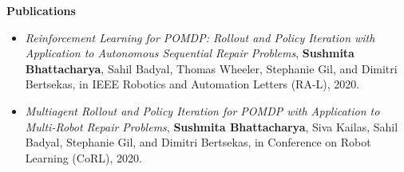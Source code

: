 \documentclass[a4paper,11pt]{article}
\newcommand{\resheading}[1]{{\small \colorbox{mygrey}{\begin{minipage}{0.975\textwidth}{\textbf{#1 \vphantom{p\^{E}}}}\end{minipage}}}}
\begin{document}
	\resheading{\textbf{\large Publications}}
	\begin{description}
		\item %
		\begin{itemize}
			\item \textit{Reinforcement Learning for POMDP: Rollout and Policy Iteration with Application to Autonomous Sequential Repair Problems}, \textbf{Sushmita Bhattacharya}, Sahil Badyal, Thomas Wheeler, Stephanie Gil, and Dimitri Bertsekas, in IEEE Robotics and Automation Letters (RA-L), 2020. %
		\end{itemize}
		\item 
		\begin{itemize}
			\item \textit{Multiagent Rollout and Policy Iteration for POMDP with Application to Multi-Robot Repair Problems}, \textbf{Sushmita Bhattacharya}, Siva Kailas, Sahil Badyal, Stephanie Gil, and Dimitri Bertsekas, in Conference on Robot Learning (CoRL), 2020. 
		\end{itemize}
	\end{description}
	
	
	\iffalse
	\resheading{\textbf{\large References}}
	\begin{description}
		\item \hspace{0.75 cm}\textbf{Dr. Stephanie Gil}\\School of Engineering and Applied Sciences (CS)\\Harvard University\\Email: sgil@seas.harvard.edu
		\item \hspace{0.75 cm}\textbf{Dr. Dimitri P. Bertsekas}\\McAfee Professor of Engineering\\Massachusetts Institute of Technology,\\Fulton Professor of Computational Decision Making\\Arizona State University\\Email: dimitrib@mit.edu
	\end{description}
	\fi
	
	
\end{document}
